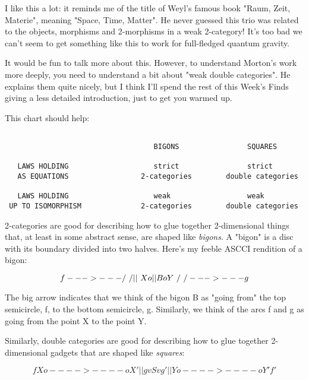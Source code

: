 I like this a lot: it reminds me of the title of Weyl's famous
book "Raum, Zeit, Materie", meaning "Space, Time, Matter".  
He never guessed this trio was related to the objects, morphisms and
2-morphisms in a weak 2-category!  It's too bad we can't seem to
get something like this to work for full-fledged quantum gravity.

It would be fun to talk more about this.  However, to understand Morton's 
work more deeply, you need to understand a bit about "weak double 
categories".  He explains them quite nicely, but I think I'll spend 
the rest of this Week's Finds giving a less detailed introduction, just
to get you warmed up.

This chart should help:


\begin{verbatim}

                                   BIGONS                SQUARES

   LAWS HOLDING                    strict                strict 
   AS EQUATIONS                 2-categories        double categories

   LAWS HOLDING                    weak                  weak
 UP TO ISOMORPHISM              2-categories        double categories
\end{verbatim}
    

2-categories are good for describing how to glue together
2-dimensional things that, at least in some abstract sense, are shaped
like \emph{bigons}.  A "bigon" is a disc with its boundary
divided into two halves.  Here's my feeble ASCCI rendition of a bigon:


$$

                      f 
                   --->---
                  /       \
                 /   ||    \
              X o    ||B    o Y
                 \   \/    /
                  \       /
                   --->---
                      g
                     
$$
    
The big arrow indicates that we think of the bigon B as "going from" 
the top semicircle, f, to the bottom semicircle, g.  Similarly, we 
think of the arcs f and g as going from the point X to the point Y.  

Similarly, double categories are good for describing how to glue together 
2-dimensional gadgets that are shaped like \emph{squares}:


$$

                      f
               X o---->----o X'
                 |         |
               g v    S    v g'
                 |         |
               Y o---->----o Y' 
                      f'
$$
    

